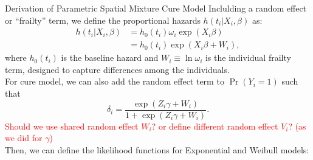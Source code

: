 \documentclass[a4paper, 12pt]{article}
\makeatletter
\renewcommand{\section}{\@startsection
	{section}    {1}    {0mm}    {-0.7\baselineskip}    {0.08\baselineskip}    {\normalfont\large\sc\center\bf}}
\makeatother
\begin{document}
\section{Derivation of Parametric Spatial Mixture Cure Model}
\noindent Inclulding a random effect or ``frailty'' term, we define the proportional hazards $h(t_i |{X}_i,{\beta})$ as:
\begin{equation}
\begin{aligned}
h(t_i |{X}_i, \beta) &= h_0(t_i)\omega_i\exp(X_i \beta)\\
& = h_0(t_i)\exp(X_i \beta+W_i),
\end{aligned}
\end{equation}
where $h_0(t_i)$ is the baseline hazard and $W_i \equiv \ln \omega_i$ is the individual frailty term, designed to capture differences among the individuals.
\\ \newline
\noindent For cure model, we can also add the random effect term to $\Pr(Y_i=1)$ such that  
\begin{equation}
\delta_i =\frac{\exp ({Z}_i{\gamma} + W_i)}{1+\exp ({Z}_i{\gamma}+W_i)}.
\end{equation}
\textcolor{red}{Should we use shared random effect $W_i$? or define different random effect $V_i$? (as we did for $\gamma$)}  \\ \newline
Then, we can define the likelihood functions for Exponential and Weibull models:
\end{document}
